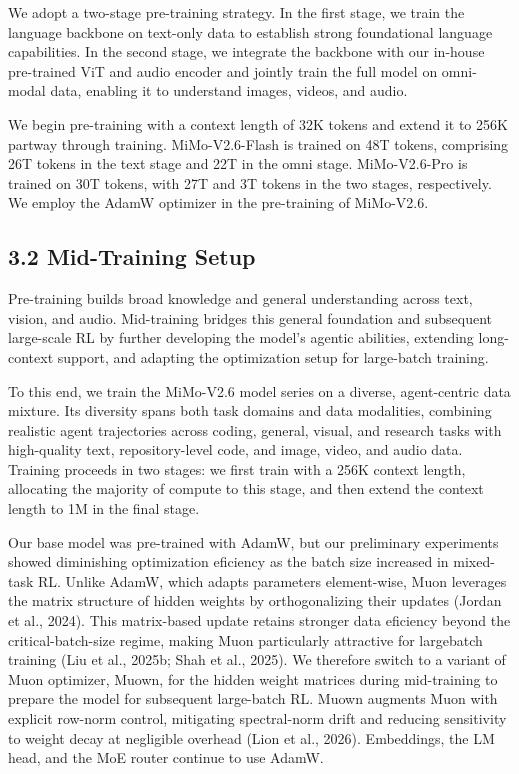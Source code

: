 \documentclass[
  10
]{article}
\begin{document}
We adopt a two-stage pre-training strategy. In the first stage, we train
the language backbone on text-only data to establish strong foundational
language capabilities. In the second stage, we integrate the backbone
with our in-house pre-trained ViT and audio encoder and jointly train
the full model on omni-modal data, enabling it to understand images,
videos, and audio.

We begin pre-training with a context length of 32K tokens and extend it
to 256K partway through training. MiMo-V2.6-Flash is trained on 48T
tokens, comprising 26T tokens in the text stage and 22T in the omni
stage. MiMo-V2.6-Pro is trained on 30T tokens, with 27T and 3T tokens in
the two stages, respectively. We employ the AdamW optimizer in the
pre-training of MiMo-V2.6.

\subsection{3.2 Mid-Training Setup}\label{mid-training-setup}

Pre-training builds broad knowledge and general understanding across
text, vision, and audio. Mid-training bridges this general foundation
and subsequent large-scale RL by further developing the model's agentic
abilities, extending long-context support, and adapting the optimization
setup for large-batch training.

To this end, we train the MiMo-V2.6 model series on a diverse,
agent-centric data mixture. Its diversity spans both task domains and
data modalities, combining realistic agent trajectories across coding,
general, visual, and research tasks with high-quality text,
repository-level code, and image, video, and audio data. Training
proceeds in two stages: we first train with a 256K context length,
allocating the majority of compute to this stage, and then extend the
context length to 1M in the final stage.

Our base model was pre-trained with AdamW, but our preliminary
experiments showed diminishing optimization eficiency as the batch size
increased in mixed-task RL. Unlike AdamW, which adapts parameters
element-wise, Muon leverages the matrix structure of hidden weights by
orthogonalizing their updates (Jordan et al., 2024). This matrix-based
update retains stronger data eficiency beyond the critical-batch-size
regime, making Muon particularly attractive for largebatch training (Liu
et al., 2025b; Shah et al., 2025). We therefore switch to a variant of
Muon optimizer, Muown, for the hidden weight matrices during
mid-training to prepare the model for subsequent large-batch RL. Muown
augments Muon with explicit row-norm control, mitigating spectral-norm
drift and reducing sensitivity to weight decay at negligible overhead
(Lion et al., 2026). Embeddings, the LM head, and the MoE router
continue to use AdamW.
\end{document}
